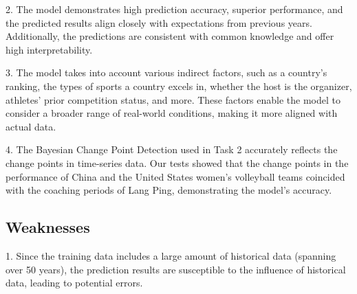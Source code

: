 \documentclass[12pt]{article}  %
\begin{document}
2. The model demonstrates high prediction accuracy, superior performance, and the predicted results align closely with expectations from previous years. Additionally, the predictions are consistent with common knowledge and offer high interpretability.

3. The model takes into account various indirect factors, such as a country's ranking, the types of sports a country excels in, whether the host is the organizer, athletes' prior competition status, and more. These factors enable the model to consider a broader range of real-world conditions, making it more aligned with actual data.

4. The Bayesian Change Point Detection used in Task 2 accurately reflects the change points in time-series data. Our tests showed that the change points in the performance of China and the United States women's volleyball teams coincided with the coaching periods of Lang Ping, demonstrating the model's accuracy.
\subsection{Weaknesses}
1. Since the training data includes a large amount of historical data (spanning over 50 years), the prediction results are susceptible to the influence of historical data, leading to potential errors.

 	
 	
\end{document}

